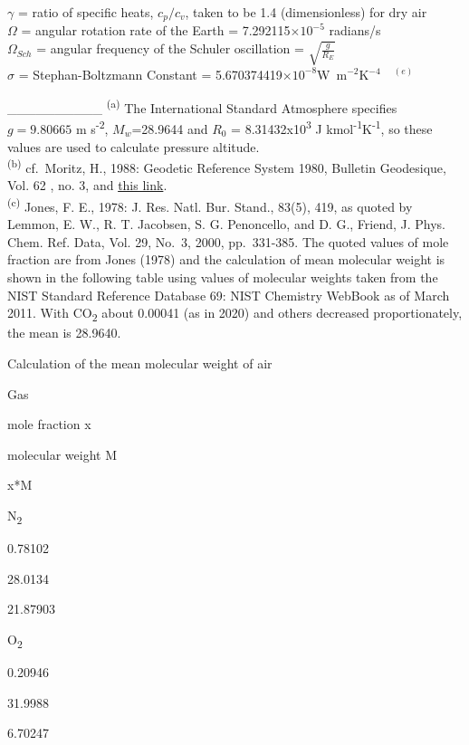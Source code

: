 \documentclass[
]{book}
\begin{document}
\(\gamma\) = ratio
of specific heats, \(c_{p}/c_{v}\),
taken to be 1.4 (dimensionless) for dry air\\
\(\Omega\) = angular
rotation rate of the Earth =
7.292115\(\times10^{-5}\) radians/s\\
\(\Omega_{Sch}\) = angular
frequency of the Schuler oscillation =
\(\sqrt{\frac{g}{R_{E}}}\)\\
\(\sigma\) = Stephan-Boltzmann
Constant = 5.670374419\(\times10^{-8}\)W~m\(^{-2}\)K\(^{-4}\)~~\(^{(e)}\)

\_\_\_\_\_\_\_\_\_\_
\textsuperscript{(a)} The International Standard Atmosphere specifies \(g=9.80665\) m s\textsuperscript{-2},
\(M_{w}\)=28.9644 and \(R_{0}\) = 8.31432x10\textsuperscript{3} J kmol\textsuperscript{-1}K\textsuperscript{-1},
so these values are used to calculate pressure altitude.\\
\textsuperscript{(b)} cf.~Moritz, H., 1988: Geodetic Reference System 1980, Bulletin Geodesique,
Vol. 62 , no. 3, and \href{http://earth-info.nga.mil/GandG/publications/tr8350.2/wgs84fin.pdf}{this link}.\\
\textsuperscript{(c)} Jones, F. E., 1978: J. Res. Natl. Bur. Stand., 83(5), 419, as quoted
by Lemmon, E. W., R. T. Jacobsen, S. G. Penoncello, and D. G., Friend,
J. Phys. Chem. Ref. Data, Vol. 29, No.~3, 2000, pp.~331-385. The quoted
values of mole fraction are from Jones (1978) and the calculation of mean
molecular weight is shown in the following table
using values of molecular weights
taken from the NIST Standard Reference Database 69: NIST Chemistry
WebBook as of March 2011. With CO\textsubscript{2} about 0.00041 (as in 2020) and others
decreased proportionately, the mean is 28.9640.

\label{tab:unnamed-chunk-22}Calculation of the mean molecular weight of air

Gas

mole fraction x

molecular weight M

x*M

N\textsubscript{2}

0.78102

28.0134

21.87903

O\textsubscript{2}

0.20946

31.9988

6.70247
\end{document}
